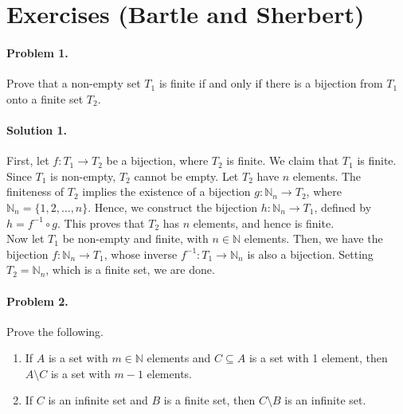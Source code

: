 \documentclass[10pt]{article}
\begin{document}
        \section*{Exercises (Bartle and Sherbert)}
        \paragraph{Problem 1.} Prove that a non-empty set $T_1$ is finite if and only if there is a bijection from $T_1$ onto a finite set $T_2$.
        \paragraph{Solution 1.} First, let $f\colon T_1 \to T_2$ be a bijection, where $T_2$ is finite. We claim that $T_1$ is finite.
        Since $T_1$ is non-empty, $T_2$ cannot be empty. Let $T_2$ have $n$ elements.
        The finiteness of $T_2$ implies the existence of a bijection $g\colon \mathbb{N}_n \to T_2$, where $\mathbb{N}_n = \{1, 2, \dots, n\}$.
        Hence, we construct the bijection $h\colon \mathbb{N}_n \to T_1$, defined by $h = f^{-1} \circ g$. This proves that $T_2$ has $n$ elements,
        and hence is finite.\\

        Now let $T_1$ be non-empty and finite, with $n \in \mathbb{N}$ elements. Then, we have the bijection $f\colon \mathbb{N}_n \to T_1$,
        whose inverse $f^{-1}\colon T_1 \to \mathbb{N}_n$ is also a bijection. Setting $T_2 = \mathbb{N}_n$, which is a finite set, we are done.

        \paragraph{Problem 2.} Prove the following.
        \begin{enumerate}
                \item If $A$ is a set with $m \in \mathbb{N}$ elements and $C\subseteq A$ is a set with 1 element, then $A\setminus C$ is a set
                with $m - 1$ elements.
                \item If $C$ is an infinite set and $B$ is a finite set, then $C\setminus B$ is an infinite set.
        \end{enumerate}
\end{document}
